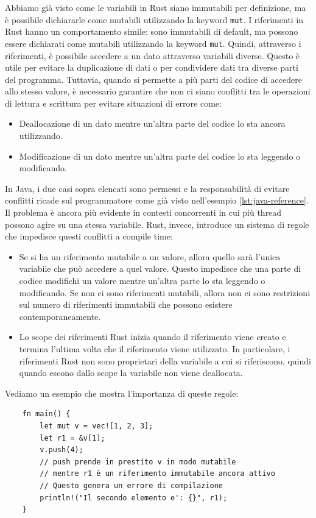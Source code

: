 Abbiamo già visto come le variabili in Rust siano immutabili per definizione, ma è possibile dichiararle come mutabili utilizzando la keyword \texttt{mut}. I riferimenti in Rust hanno un comportamento simile: sono immutabili di default, ma possono essere dichiarati come mutabili utilizzando la keyword \texttt{mut}. Quindi, attraverso i riferimenti, è possibile accedere a un dato attraverso variabili diverse. Questo è utile per evitare la duplicazione di dati o per condividere dati tra diverse parti del programma. Tuttavia, quando si permette a più parti del codice di accedere allo stesso valore, è necessario garantire che non ci siano conflitti tra le operazioni di lettura e scrittura per evitare situazioni di errore come:
\begin{itemize}
    \item Deallocazione di un dato mentre un'altra parte del codice lo sta ancora utilizzando.
    \item Modificazione di un dato mentre un'altra parte del codice lo sta leggendo o modificando.
\end{itemize} 
In Java, i due casi sopra elencati sono permessi e la responsabilità di evitare conflitti ricade sul programmatore come già visto nell'esempio \ref{lst:java-reference}. Il problema è ancora più evidente in contesti concorrenti in cui più thread possono agire su una stessa variabile. Rust, invece, introduce un sistema di regole che impedisce questi conflitti a compile time:
\begin{itemize}
    \item Se si ha un riferimento mutabile a un valore, allora quello sarà l'unica variabile che può accedere a quel valore. Questo impedisce che una parte di codice modifichi un valore mentre un'altra parte lo sta leggendo o modificando. Se non ci sono riferimenti mutabili, allora non ci sono restrizioni sul numero di riferimenti immutabili che possono esistere contemporaneamente. 
    \item Lo scope dei riferimenti Rust inizia quando il riferimento viene creato e termina l'ultima volta che il riferimento viene utilizzato. In particolare, i riferimenti Rust non sono proprietari della variabile a cui si riferiscono, quindi quando escono dallo scope la variabile non viene deallocata.
\end{itemize}
Vediamo un esempio che mostra l'importanza di queste regole:
\begin{verbatim}
    fn main() {
        let mut v = vec![1, 2, 3];
        let r1 = &v[1];
        v.push(4);
        // push prende in prestito v in modo mutabile
        // mentre r1 è un riferimento immutabile ancora attivo
        // Questo genera un errore di compilazione
        println!("Il secondo elemento e': {}", r1);
    } 
\end{verbatim}
